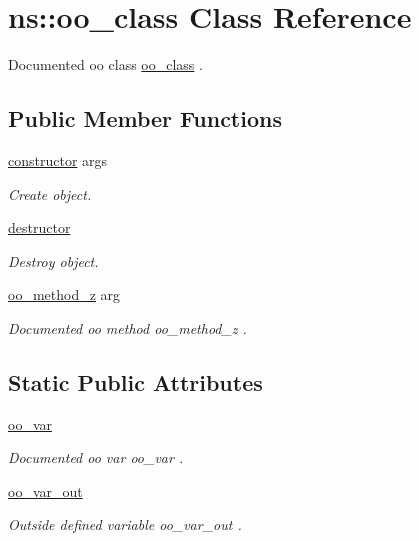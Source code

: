 \hypertarget{classns_1_1oo__class}{}\section{ns\+::oo\+\_\+class Class Reference}
\label{classns_1_1oo__class}


Documented oo class {\ttfamily \mbox{\hyperlink{classns_1_1oo__class}{oo\+\_\+class}}} .  


\subsection*{Public Member Functions}
\begin{DoxyCompactItemize}
\item 
\mbox{\hyperlink{classns_1_1oo__class_aa26b64151d4b4b0e8b4977aae7048f9b}{constructor}} args
\begin{DoxyCompactList}\small\item\em Create object. \end{DoxyCompactList}\item 
\mbox{\hyperlink{classns_1_1oo__class_af148cfc1c090a05986c68ac9452a510a}{destructor}}
\begin{DoxyCompactList}\small\item\em Destroy object. \end{DoxyCompactList}\item 
\mbox{\hyperlink{classns_1_1oo__class_a8a3cfbae3b3fca463f08adb9174a5fe8}{oo\+\_\+method\+\_\+z}} arg
\begin{DoxyCompactList}\small\item\em Documented oo method {\ttfamily oo\+\_\+method\+\_\+z} . \end{DoxyCompactList}\end{DoxyCompactItemize}
\subsection*{Static Public Attributes}
\begin{DoxyCompactItemize}
\item 
\mbox{\hyperlink{classns_1_1oo__class_a741f11f4a2db3876205658d4a9a279ba}{oo\+\_\+var}}
\begin{DoxyCompactList}\small\item\em Documented oo var {\ttfamily oo\+\_\+var} . \end{DoxyCompactList}\item 
\mbox{\hyperlink{classns_1_1oo__class_af46293ede16067c38ca2901416cad8ee}{oo\+\_\+var\+\_\+out}}
\begin{DoxyCompactList}\small\item\em Outside defined variable {\ttfamily oo\+\_\+var\+\_\+out} . \end{DoxyCompactList}\end{DoxyCompactItemize}
